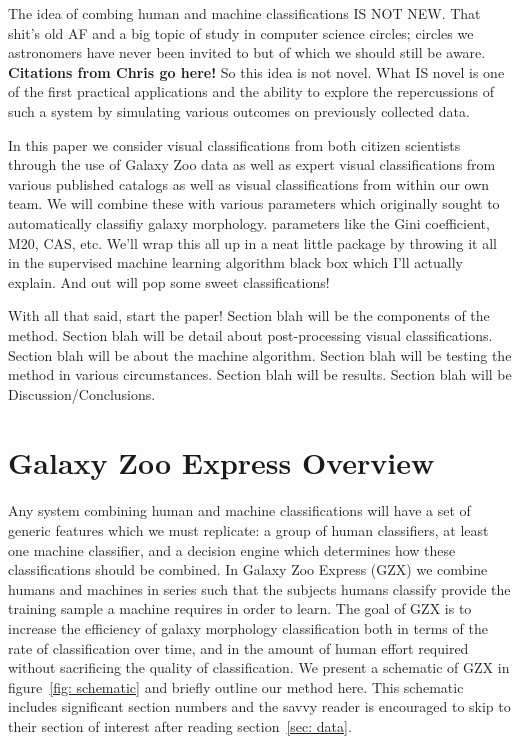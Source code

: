 \documentclass[twocolumn]{aastex6}
\begin{document}
The idea of combing human and machine classifications IS NOT NEW. That shit's
old AF and a big topic of study in computer science circles; circles we astronomers
have never been invited to but of which we should still be aware. \textbf{Citations
from Chris go here!} So this idea is not novel. What IS novel is one of the first practical
applications and the ability to explore the repercussions of such a system by 
simulating various outcomes on previously collected data. 


In this paper we consider visual classifications from both citizen scientists through
the use of Galaxy Zoo data as well as expert visual classifications from various 
published catalogs as well as visual classifications from within our own team. We 
will combine these with various parameters which originally sought to automatically
classifiy galaxy morphology. parameters like the Gini coefficient, M20, CAS, etc. 
We'll wrap this all up in a neat little package by throwing it all in the 
supervised machine learning algorithm black box which I'll actually explain.
And out will pop some sweet classifications! 

With all that said, start the paper! Section blah will be the components of the method. Section blah will be detail about post-processing visual classifications. Section blah will be about the machine algorithm. Section blah will be testing the method in various circumstances. Section blah will be results. Section blah will be Discussion/Conclusions. 





\section{Galaxy Zoo Express Overview}
Any system combining human and machine classifications will have a set of generic features 
which we must replicate: a group of human classifiers, at least one machine classifier, and a 
decision engine which determines how these classifications should be combined. 
In Galaxy Zoo Express (GZX) we combine humans and machines in series such that the 
subjects humans classify provide the training sample a machine requires in order to learn. 
The goal of GZX is to increase the efficiency of galaxy morphology classification both
in terms of the rate of classification over time, and in the amount of human effort required 
without sacrificing the quality of classification. 
We present a schematic of GZX in figure~\ref{fig: schematic} and briefly outline 
our method here. This schematic includes significant section numbers and the savvy 
reader is encouraged to skip to their section of interest after reading section~\ref{sec: data}.
\end{document}

